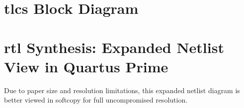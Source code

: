 \begin{appendices}
	\section{\acs{tlcs} Block Diagram\label{app:tlcsbd}}
	\vspace{-1cm}
	\smash
	{\begin{minipage}[t][][b]{\linewidth}
			
		\end{minipage}}
	\clearpage
	\section{\acs{rtl} Synthesis: Expanded Netlist View in Quartus Prime}\label{app:rtl}
	Due to paper size and resolution limitations, this expanded netlist diagram is better viewed in softcopy for full uncompromised resolution.

	\begin{minipage}[t][][b]{\linewidth}
		
	\end{minipage}
	\clearpage
\end{appendices}